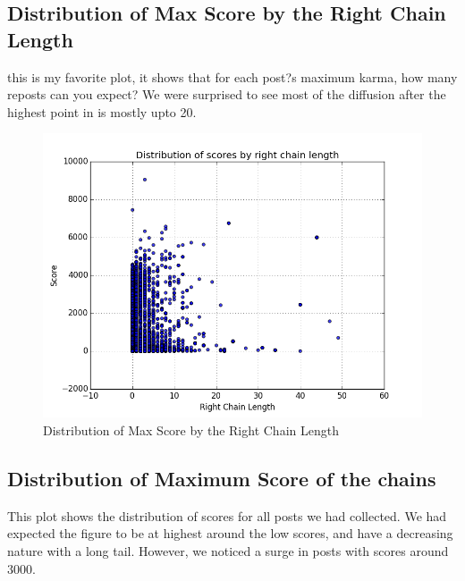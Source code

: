 \documentclass{article} %
\begin{document}
\subsection{Distribution of Max Score by the Right Chain Length}

this is my favorite plot, it shows that for each post?s maximum karma, how many reposts can you expect? We were surprised to see most of the diffusion after the highest point in is mostly upto 20.

\begin{figure}[h]
\begin{center}
\includegraphics[width=5in]{score_right_chain.png}
\caption{Distribution of Max Score by the Right Chain Length}
\end{center}
\end{figure}

\subsection{Distribution of Maximum Score of the chains}

This plot shows the distribution of scores for all posts we had collected. We had expected the figure to be at highest around the low scores, and have a decreasing nature with a long tail. However, we noticed a surge in posts with scores around 3000.
\end{document}

